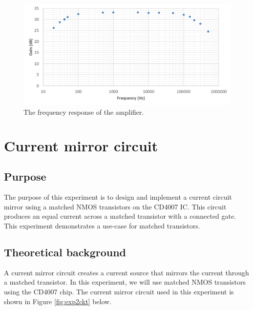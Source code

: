 \documentclass{report}
\begin{document}
\begin{figure}[H]
	\centering
	\includegraphics[width=0.9\linewidth]{exp1freq}
	\caption{The frequency response of the amplifier.}
	\label{fig:exp1freq}
\end{figure}

\pagebreak

\section{Current mirror circuit}

\subsection{Purpose}
The purpose of this experiment is to design and implement a current circuit mirror using a matched NMOS transistors on the CD4007 IC. This circuit produces an equal current across a matched transistor with a connected gate. This experiment demonstrates a use-case for matched transistors.

\subsection{Theoretical background}
A current mirror circuit creates a current source that mirrors the current through a matched transistor. In this experiment, we will use matched NMOS transistors using the CD4007 chip. The current mirror circuit used in this experiment is shown in Figure \ref{fig:exp2ckt} below.
\end{document}
